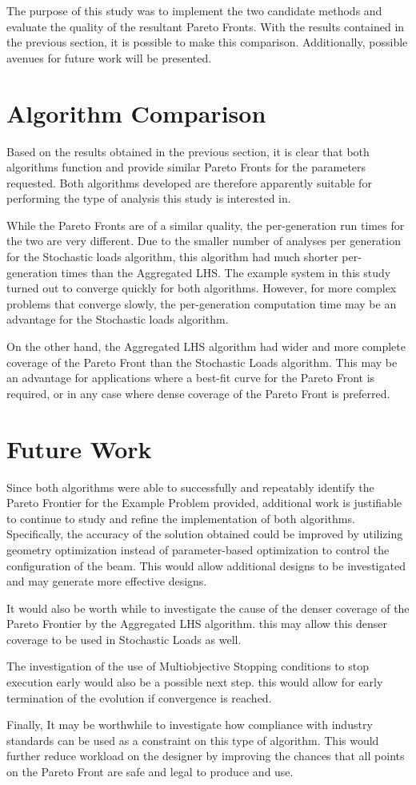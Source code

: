 The purpose of this study was to implement the two candidate methods and evaluate the quality of the resultant Pareto Fronts. With the results contained in the previous section, it is possible to make this comparison. Additionally, possible avenues for future work will be presented.  

\section{Algorithm Comparison}
Based on the results obtained in the previous section, it is clear that both algorithms function and provide similar Pareto Fronts for the parameters requested. Both algorithms developed are therefore apparently suitable for performing the type of analysis this study is interested in.

While the Pareto Fronts are of a similar quality, the per-generation run times for the two are very different. Due to the smaller number of analyses per generation for the Stochastic loads algorithm, this algorithm had much shorter per-generation times than the Aggregated LHS. The example system in this study turned out to converge quickly for both algorithms. However, for more complex problems that converge slowly, the per-generation computation time may be an advantage for the Stochastic loads algorithm. 

On the other hand, the Aggregated LHS algorithm had wider and more complete coverage of the Pareto Front than the Stochastic Loads algorithm. This may be an advantage for applications where a best-fit curve for the Pareto Front is required, or in any case where dense coverage of the Pareto Front is preferred. 

\section{Future Work}
Since both algorithms were able to successfully and repeatably identify the Pareto Frontier for the Example Problem provided, additional work is justifiable to continue to study and refine the implementation of both algorithms. Specifically, the accuracy of the solution obtained could be improved by utilizing geometry optimization instead of parameter-based optimization to control the configuration of the beam. This would allow additional designs to be investigated and may generate more effective designs.

It would also be worth while to investigate the cause of the denser coverage of the Pareto Frontier by the Aggregated LHS algorithm. this may allow this denser coverage to be used in Stochastic Loads as well. 

The investigation of the use of Multiobjective Stopping conditions to stop execution early would also be a possible next step. this would allow for early termination of the evolution if convergence is reached. 

Finally, It may be worthwhile to investigate how compliance with industry standards can be used as a constraint on this type of algorithm. This would further reduce workload on the designer by improving the chances that all points on the Pareto Front are safe and legal to produce and use. 
